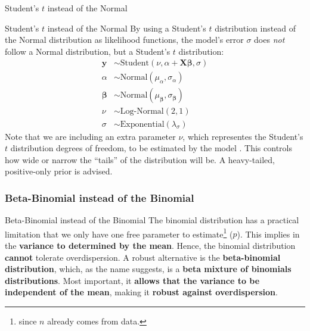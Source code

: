 \begin{frame}{Student's $t$ instead of the Normal}
	\centering
\end{frame}

\begin{frame}{Student's $t$ instead of the Normal}
	By using a Student's $t$ distribution instead of the Normal distribution
	as likelihood functions,
	the model's error $\sigma$ does \textit{not} follow a Normal distribution,
	but a Student's $t$ distribution:
	$$
		\begin{aligned}
			\boldsymbol{y}     & \sim \text{Student}\left( \nu, \alpha + \mathbf{X} \boldsymbol{\beta}, \sigma \right) \\
			\alpha             & \sim \text{Normal}(\mu_\alpha, \sigma_\alpha)                                         \\
			\boldsymbol{\beta} & \sim \text{Normal}(\mu_{\boldsymbol{\beta}}, \sigma_{\boldsymbol{\beta}})             \\
			\nu                & \sim \text{Log-Normal}(2, 1)                                                          \\
			\sigma             & \sim \text{Exponential}(\lambda_\sigma)
		\end{aligned}
	$$
	\small
	Note that we are including an extra parameter $\nu$,
	which representes the Student's $t$ distribution degrees of freedom,
	to be estimated by the model \parencite{gelman2013bayesian}.
	This controls how wide or narrow the ``tails'' of the distribution will be.
	A heavy-tailed, positive-only prior is advised.
\end{frame}

\subsubsection{Beta-Binomial instead of the Binomial}
\begin{frame}{Beta-Binomial instead of the Binomial}
	The binomial distribution has a practical limitation that we only have
	one free parameter to estimate\footnote{since $n$ already comes from data.} ($p$).
	This implies in the \textbf{variance to determined by the mean}.
	Hence, the binomial distribution \textbf{cannot} tolerate overdispersion.
	\vfill
	A robust alternative is the \textbf{beta-binomial distribution}, which,
	as the name suggests, is a \textbf{beta mixture of binomials distributions}.
	Most important, it \textbf{allows that the variance to be independent of the mean},
	making it \textbf{robust against overdispersion}.
\end{frame}

